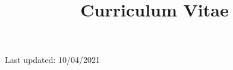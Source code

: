 \documentclass[a4paper,12pt]{curve}
\title{Curriculum Vitae}
\begin{document}
            \makeheaders[t]
            \maketitle
            \begin{center}
Last updated: 10/04/2021
\end{center}
            
\end{document}

